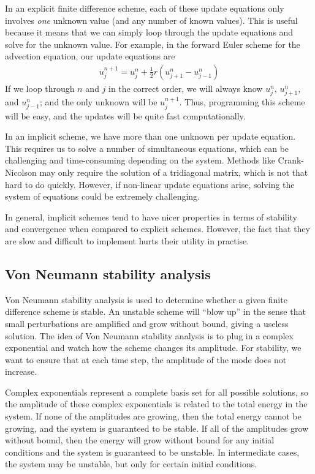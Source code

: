 \documentclass[twocolumn]{myarticle}
\begin{document}
In an explicit finite difference scheme, each of these update equations only involves \emph{one} unknown value (and any number of known values).
This is useful because it means that we can simply loop through the update equations and solve for the unknown value.
For example, in the forward Euler scheme for the advection equation, our update equations are
\begin{align}
    u^{n+1}_{j} = u^n_j + \frac{1}{2} r \left(u^{n}_{j+1} - u^{n}_{j-1}\right)
\end{align}
If we loop through $ n $ and $ j $ in the correct order, we will always know $ u^n_j $, $ u^n_{j+1} $, and $ u^{n}_{j-1} $; and the only unknown will be $ u^{n+1}_{j} $.
Thus, programming this scheme will be easy, and the updates will be quite fast computationally.

In an implicit scheme, we have more than one unknown per update equation.
This requires us to solve a number of simultaneous equations, which can be challenging and time-consuming depending on the system.
Methods like Crank-Nicolson may only require the solution of a tridiagonal matrix, which is not that hard to do quickly.
However, if non-linear update equations arise, solving the system of equations could be extremely challenging.

In general, implicit schemes tend to have nicer properties in terms of stability and convergence when compared to explicit schemes.
However, the fact that they are slow and difficult to implement hurts their utility in practise.

\subsection{Von Neumann stability analysis}
\label{subsec:von_neumann_stability_analysis}

Von Neumann stability analysis is used to determine whether a given finite difference scheme is stable.
An unstable scheme will ``blow up'' in the sense that small perturbations are amplified and grow without bound, giving a useless solution.
The idea of Von Neumann stability analysis is to plug in a complex exponential and watch how the scheme changes its amplitude.
For stability, we want to ensure that at each time step, the amplitude of the mode does not increase.

Complex exponentials represent a complete basis set for all possible solutions, so the amplitude of these complex exponentials is related to the total energy in the system.
If none of the amplitudes are growing, then the total energy cannot be growing, and the system is guaranteed to be stable.
If all of the amplitudes grow without bound, then the energy will grow without bound for any initial conditions and the system is guaranteed to be unstable.
In intermediate cases, the system may be unstable, but only for certain initial conditions.
\end{document}
